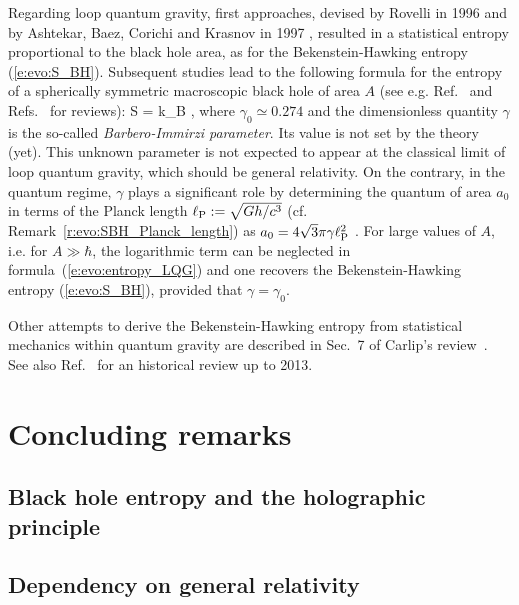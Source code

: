 Regarding loop quantum gravity, first approaches, devised by Rovelli in 1996 \cite{Rovel96}
and by Ashtekar, Baez, Corichi and Krasnov in 1997 \cite{AshteBCK98},
resulted in a statistical entropy proportional to the black hole area,
as for the Bekenstein-Hawking entropy (\ref{e:evo:S_BH}). Subsequent studies
lead to the following
formula for the entropy of a spherically symmetric macroscopic black hole of area $A$
(see e.g. Ref.~\cite{EngleNP10} and Refs.~\cite{BarbeP23,Carli14,Perez17} for reviews):
\be \label{e:evo:entropy_LQG}
    S = k_{\rm B}  ,
\ee
where $\gamma_0 \simeq 0.274$ and the dimensionless quantity $\gamma$ is the so-called
\emph{Barbero-Immirzi parameter}.
Its value is not set by the theory (yet). This unknown parameter
is not expected to appear at the classical limit of
loop quantum gravity, which should be general relativity.
On the contrary, in the quantum regime, $\gamma$ plays a significant role
by determining the quantum of area $a_0$ in terms of
the Planck length $\ell_{\rm P} := \sqrt{Gh/c^3}$ (cf. Remark~\ref{r:evo:SBH_Planck_length}) as
$a_0 = 4\sqrt{3}\pi \gamma \ell_{\rm P}^2$ \cite{Rovel04}.
For large values of $A$, i.e.  for $A\gg \hbar$,
the logarithmic term can be neglected in formula~(\ref{e:evo:entropy_LQG}) and one recovers the
Bekenstein-Hawking entropy (\ref{e:evo:S_BH}), provided that $\gamma = \gamma_0$.

Other attempts to derive the Bekenstein-Hawking entropy from statistical mechanics
within quantum gravity are described in Sec.~7 of Carlip's review~\cite{Carli14}.
See also Ref.~\cite{GrumiMS15} for an historical review up to 2013.


\section{Concluding remarks}

\subsection{Black hole entropy and the holographic principle}

\subsection{Dependency on general relativity}

